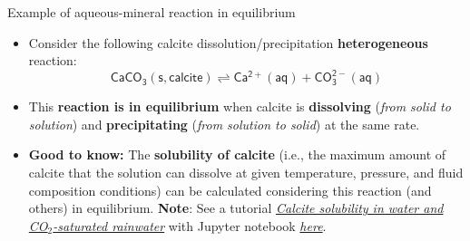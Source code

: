 \begin{frame}[<+->]{Example of aqueous-mineral reaction in equilibrium}
\begin{itemize}
\item Consider the following calcite dissolution/precipitation \textbf{heterogeneous} reaction:
\[
\mathrm{\mathsf{CaCO_{3}(s,calcite) \rightleftharpoons Ca^{2+}(aq)+CO_{3}^{2-}(aq)}}
\]
\item This \alert{\bf reaction is in equilibrium} when calcite is \textbf{dissolving
}(\emph{from solid to solution}) and \textbf{precipitating} (\emph{from
solution to solid}) at the same rate. 
\item \textbf{\alert{\textbf{Good to know:}}} The \textbf{solubility of
calcite} (i.e., the maximum amount of calcite that the solution can
dissolve at given temperature, pressure, and fluid composition conditions)
can be calculated considering this reaction (and others) in equilibrium.
\vskip 5pt
\alert{\textbf{Note}}: See a tutorial \href{https://reaktoro.org/applications/solubility/solubility-calcite-on-acidity-and-temperature.html}{\textcolor{indigo(dye)}{\it Calcite solubility in water and CO$_2$-saturated rainwater}} with Jupyter notebook \href{Calcite solubility in water and CO2-saturated rainwater}{\textcolor{indigo(dye)}{\it here}}.
\end{itemize}

\end{frame}

%
